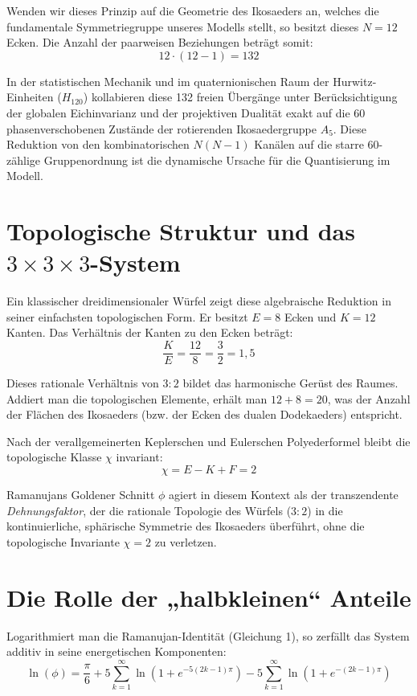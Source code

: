 \documentclass[11pt,a4paper]{article}
\begin{document}
	Wenden wir dieses Prinzip auf die Geometrie des Ikosaeders an, welches die fundamentale Symmetriegruppe unseres Modells stellt, so besitzt dieses $N = 12$ Ecken. Die Anzahl der paarweisen Beziehungen beträgt somit:
	\begin{equation}
		12 \cdot (12 - 1) = 132
	\end{equation}
	
	In der statistischen Mechanik und im quaternionischen Raum der Hurwitz-Einheiten ($H_{120}$) kollabieren diese 132 freien Übergänge unter Berücksichtigung der globalen Eichinvarianz und der projektiven Dualität exakt auf die 60 phasenverschobenen Zustände der rotierenden Ikosaedergruppe $A_5$. Diese Reduktion von den kombinatorischen $N(N-1)$ Kanälen auf die starre 60-zählige Gruppenordnung ist die dynamische Ursache für die Quantisierung im Modell.
	
	\section{Topologische Struktur und das $3\times3\times3$-System}
	Ein klassischer dreidimensionaler Würfel zeigt diese algebraische Reduktion in seiner einfachsten topologischen Form. Er besitzt $E = 8$ Ecken und $K = 12$ Kanten. Das Verhältnis der Kanten zu den Ecken beträgt:
	\begin{equation}
		\frac{K}{E} = \frac{12}{8} = \frac{3}{2} = 1{,}5
	\end{equation}
	
	Dieses rationale Verhältnis von $3:2$ bildet das harmonische Gerüst des Raumes. Addiert man die topologischen Elemente, erhält man $12 + 8 = 20$, was der Anzahl der Flächen des Ikosaeders (bzw. der Ecken des dualen Dodekaeders) entspricht. 
	
	Nach der verallgemeinerten Keplerschen und Eulerschen Polyederformel bleibt die topologische Klasse $\chi$ invariant:
	\begin{equation}
		\chi = E - K + F = 2
	\end{equation}
	
	Ramanujans Goldener Schnitt $\phi$ agiert in diesem Kontext als der transzendente \textit{Dehnungsfaktor}, der die rationale Topologie des Würfels ($3:2$) in die kontinuierliche, sphärische Symmetrie des Ikosaeders überführt, ohne die topologische Invariante $\chi = 2$ zu verletzen.
	
	\section{Die Rolle der „halbkleinen“ Anteile}
	Logarithmiert man die Ramanujan-Identität (Gleichung 1), so zerfällt das System additiv in seine energetischen Komponenten:
	\begin{equation}
		\ln(\phi) = \frac{\pi}{6} + 5 \sum_{k=1}^{\infty} \ln\left(1 + e^{-5(2k-1)\pi}\right) - 5 \sum_{k=1}^{\infty} \ln\left(1 + e^{-(2k-1)\pi}\right)
	\end{equation}
	
\end{document}

